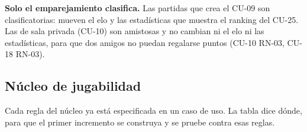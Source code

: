 \textbf{Solo el emparejamiento clasifica.} Las partidas que crea el \mbox{CU-09} son clasificatorias: mueven el elo y las estadísticas que muestra el ranking del \mbox{CU-25}. Las de sala privada (\mbox{CU-10}) son amistosas y no cambian ni el elo ni las estadísticas, para que dos amigos no puedan regalarse puntos (\mbox{CU-10} \mbox{RN-03}, \mbox{CU-18} \mbox{RN-03}).

\subsection*{Núcleo de jugabilidad}

Cada regla del núcleo ya está especificada en un caso de uso. La tabla dice dónde, para que el primer incremento se construya y se pruebe contra esas reglas.

